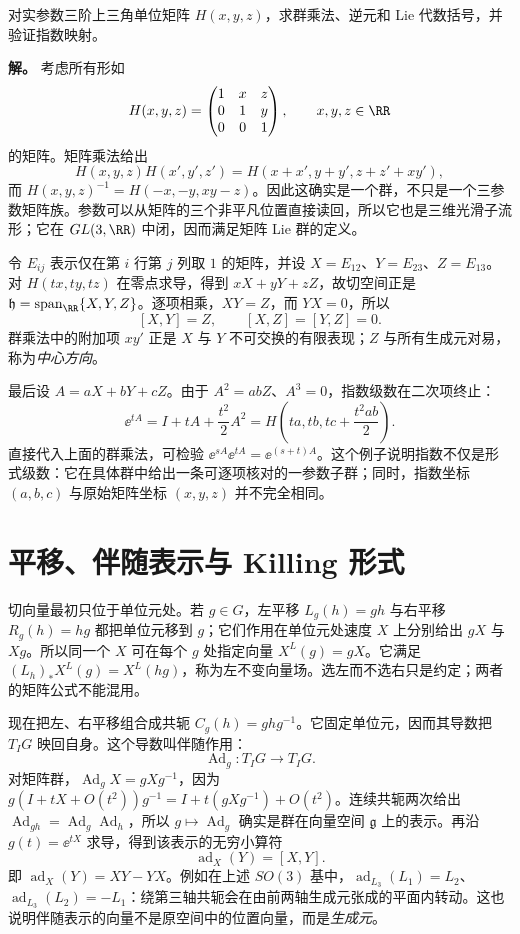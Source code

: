 \begin{example}
对实参数三阶上三角单位矩阵 $H(x,y,z)$，求群乘法、逆元和 Lie 代数括号，并验证指数映射。

\textbf{解。} 考虑所有形如
\[
H(x,y,z)=\begin{pmatrix}1&x&z\\0&1&y\\0&0&1\end{pmatrix},
\qquad x,y,z\in\RR
\]
的矩阵。矩阵乘法给出
\[
H(x,y,z)H(x',y',z')
=H(x+x',y+y',z+z'+xy'),
\]
而 $H(x,y,z)^{-1}=H(-x,-y,xy-z)$。因此这确实是一个群，不只是一个三参数矩阵族。参数可以从矩阵的三个非平凡位置直接读回，所以它也是三维光滑子流形；它在 $GL(3,\RR)$ 中闭，因而满足矩阵 Lie 群的定义。

令 $E_{ij}$ 表示仅在第 $i$ 行第 $j$ 列取 $1$ 的矩阵，并设 $X=E_{12}$、$Y=E_{23}$、$Z=E_{13}$。对 $H(tx,ty,tz)$ 在零点求导，得到 $xX+yY+zZ$，故切空间正是 $\mathfrak h=\operatorname{span}_{\RR}\{X,Y,Z\}$。逐项相乘，$XY=Z$，而 $YX=0$，所以
\[
[X,Y]=Z,\qquad [X,Z]=[Y,Z]=0.
\]
群乘法中的附加项 $xy'$ 正是 $X$ 与 $Y$ 不可交换的有限表现；$Z$ 与所有生成元对易，称为\emph{中心方向}。

最后设 $A=aX+bY+cZ$。由于 $A^2=abZ$、$A^3=0$，指数级数在二次项终止：
\[
\ee^{tA}=I+tA+\frac{t^2}{2}A^2
=H\!\left(ta,tb,tc+\frac{t^2ab}{2}\right).
\]
直接代入上面的群乘法，可检验 $\ee^{sA}\ee^{tA}=\ee^{(s+t)A}$。这个例子说明指数不仅是形式级数：它在具体群中给出一条可逐项核对的一参数子群；同时，指数坐标 $(a,b,c)$ 与原始矩阵坐标 $(x,y,z)$ 并不完全相同。
\end{example}

\section{平移、伴随表示与 Killing 形式}

切向量最初只位于单位元处。若 $g\in G$，左平移 $L_g(h)=gh$ 与右平移 $R_g(h)=hg$ 都把单位元移到 $g$；它们作用在单位元处速度 $X$ 上分别给出 $gX$ 与 $Xg$。所以同一个 $X$ 可在每个 $g$ 处指定向量 $X^L(g)=gX$。它满足 $(L_h)_*X^L(g)=X^L(hg)$，称为左不变向量场。选左而不选右只是约定；两者的矩阵公式不能混用。

现在把左、右平移组合成共轭 $C_g(h)=ghg^{-1}$。它固定单位元，因而其导数把 $T_IG$ 映回自身。这个导数叫伴随作用：
\begin{equation}
\operatorname{Ad}_g:T_IG\longrightarrow T_IG.
\label{eq:group-adjoint}
\end{equation}
对矩阵群，$\operatorname{Ad}_gX=gXg^{-1}$，因为 $g(I+tX+O(t^2))g^{-1}=I+t(gXg^{-1})+O(t^2)$。连续共轭两次给出 $\operatorname{Ad}_{gh}=\operatorname{Ad}_g\operatorname{Ad}_h$，所以 $g\mapsto\operatorname{Ad}_g$ 确实是群在向量空间 $\mathfrak g$ 上的表示。再沿 $g(t)=\ee^{tX}$ 求导，得到该表示的无穷小算符
\begin{equation}
\operatorname{ad}_X(Y)=[X,Y].
\label{eq:algebra-adjoint}
\end{equation}
即 $\operatorname{ad}_X(Y)=XY-YX$。例如在上述 $SO(3)$ 基中，$\operatorname{ad}_{L_3}(L_1)=L_2$、$\operatorname{ad}_{L_3}(L_2)=-L_1$：绕第三轴共轭会在由前两轴生成元张成的平面内转动。这也说明伴随表示的向量不是原空间中的位置向量，而是\emph{生成元}。

